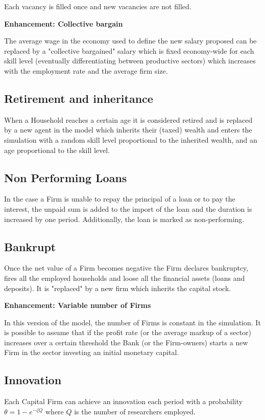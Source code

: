 \documentclass[a4paper, headings=standardclasses]{scrartcl}
\numberwithin{equation}{subsection}
\newenvironment{enh}[1][]{\begin{framed}\noindent\textbf{Enhancement: #1}\par}{\end{framed}}
\begin{document}
Each vacancy is filled once and new vacancies are not filled.

\begin{enh}[Collective bargain]
    The average wage in the economy used to define the new salary proposed can be replaced by a "collective bargained" salary which is fixed economy-wide for each skill level (eventually differentiating between productive sectors) which increases with the employment rate and the average firm size.
\end{enh}

\subsection{Retirement and inheritance}
When a Household reaches a certain age it is considered retired and is replaced by a new agent in the model which inherits their (taxed) wealth and enters the simulation with a random skill level proportional to the inherited wealth, and an age proportional to the skill level.

\subsection{Non Performing Loans}
In the case a Firm is unable to repay the principal of a loan or to pay the interest, the unpaid sum is added to the import of the loan and the duration is increased by one period. Additionally, the loan is marked as non-performing.

\subsection{Bankrupt}
Once the net value of a Firm becomes negative the Firm declares bankruptcy, fires all the employed households and loose all the financial assets (loans and deposits). It is "replaced" by a new firm which inherits the capital stock.

\begin{enh}[Variable number of Firms]
    In this version of the model, the number of Firms is constant in the simulation. It is possible to assume that if the profit rate (or the average markup of a sector) increases over a certain threshold the Bank (or the Firm-owners) starts a new Firm in the sector investing an initial monetary capital.
\end{enh}

\subsection{Innovation}
Each Capital Firm can achieve an innovation each period with a probability $\theta = 1 - e^{-\zeta Q}$ where $Q$ is the number of researchers employed.
\end{document}
